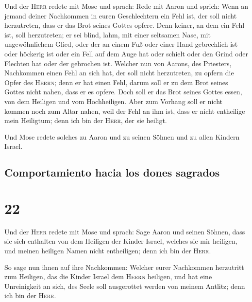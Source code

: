  Und der \textsc{Herr} redete mit Mose und sprach:
 Rede mit Aaron und sprich: Wenn an jemand deiner
Nachkommen in euren Geschlechtern ein Fehl ist, der soll nicht
herzutreten, dass er das Brot seines Gottes opfere.  Denn
keiner, an dem ein Fehl ist, soll herzutreten; er sei blind, lahm, mit
einer seltsamen Nase, mit ungewöhnlichem Glied,  oder der
an einem Fuß oder einer Hand gebrechlich ist  oder
höckerig ist oder ein Fell auf dem Auge hat oder schielt oder den Grind
oder Flechten hat oder der gebrochen ist.  Welcher nun
von Aarons, des Priesters, Nachkommen einen Fehl an sich hat, der soll
nicht herzutreten, zu opfern die Opfer des \textsc{Herrn}; denn er hat
einen Fehl, darum soll er zu dem Brot seines Gottes nicht nahen, dass er
es opfere.  Doch soll er das Brot seines Gottes essen,
von dem Heiligen und vom Hochheiligen.  Aber zum Vorhang
soll er nicht kommen noch zum Altar nahen, weil der Fehl an ihm ist,
dass er nicht entheilige mein Heiligtum; denn ich bin der \textsc{Herr},
der sie heiligt.

 Und Mose redete solches zu Aaron und zu seinen Söhnen
und zu allen Kindern Israel.

\hypertarget{comportamiento-hacia-los-dones-sagrados}{%
\subsection{Comportamiento hacia los dones
sagrados}\label{comportamiento-hacia-los-dones-sagrados}}

\hypertarget{section-21}{%
\section{22}\label{section-21}}

 Und der \textsc{Herr} redete mit Mose und sprach:
 Sage Aaron und seinen Söhnen, dass sie sich enthalten von
dem Heiligen der Kinder Israel, welches sie mir heiligen, und meinen
heiligen Namen nicht entheiligen; denn ich bin der \textsc{Herr}.

 So sage nun ihnen auf ihre Nachkommen: Welcher eurer
Nachkommen herzutritt zum Heiligen, das die Kinder Israel dem
\textsc{Herrn} heiligen, und hat eine Unreinigkeit an sich, des Seele
soll ausgerottet werden von meinem Antlitz; denn ich bin der
\textsc{Herr}.

